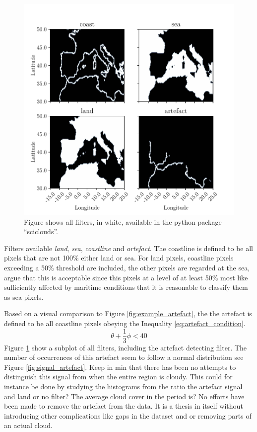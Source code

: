 \begin{figure}
    \centering
    \includegraphics{python_figs/filters.pdf}
    \caption{Figure shows all filters, in white, available in the python package ``sciclouds''.}
    \label{fig:filters_subplot}
\end{figure}
Filters available \textit{land}, \textit{sea}, \textit{coastline} and \textit{artefact}. The coastline is defined to be all pixels that are not 100\% either land or sea. For land pixels, coastline pixels exceeding a 50\% threshold are included, the other pixels are regarded at the sea, argue that this is acceptable since this pixels at a level of at least 50\% most like sufficiently affected by maritime conditions that it is reasonable to classify them as sea pixels.

Based on a visual comparison to Figure \ref{fig:example_artefact}, the the artefact is defined to be all coastline pixels obeying the Inequality \eqref{eq:artefact_condition}.
\begin{equation} \label{eq:artefact_condition}
    \theta + \frac{1}{3}\phi < 40
\end{equation}
Figure \ref{fig:filters_subplot} show a subplot of all filters, including the artefact detecting filter. 
The number of occurrences of this artefact seem to follow a normal distribution see Figure \ref{fig:signal_artefact}. Keep in min that there has been no attempts to distinguish this signal from when the entire region is cloudy. This could for instance be done by studying the histograms from the ratio the artefact signal and land or no filter? The average cloud cover in the period is? 
No efforts have been made to remove the artefact from the data. It is a thesis in itself %
without introducing other complications like gaps in the dataset and or removing parts of an actual cloud.

